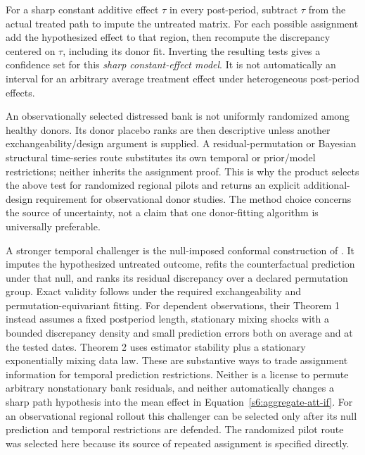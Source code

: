 For a sharp constant additive effect $\tau$ in every post-period, subtract
$\tau$ from the actual treated path to impute the untreated matrix. For
each possible assignment add the hypothesized effect to that region, then
recompute the discrepancy centered on $\tau$, including its donor fit.
Inverting the resulting tests gives a confidence set for this \emph{sharp
constant-effect model}. It is not automatically an interval for an arbitrary
average treatment effect under heterogeneous post-period effects.

An observationally selected distressed bank is not uniformly randomized
among healthy donors. Its donor placebo ranks are then descriptive unless
another exchangeability/design argument is supplied. A residual-permutation
or Bayesian structural time-series route substitutes its own temporal or
prior/model restrictions; neither inherits the assignment proof. This is
why the product selects the above test for randomized regional pilots and
returns an explicit additional-design requirement for observational donor
studies. The method choice concerns the source of uncertainty, not a claim
that one donor-fitting algorithm is universally preferable.


A stronger temporal challenger is the null-imposed conformal construction
of \citet{conformal2022}. It imputes the hypothesized untreated outcome,
refits the counterfactual prediction under that null, and ranks its residual
discrepancy over a declared permutation group. Exact validity follows under
the required exchangeability and permutation-equivariant fitting. For
dependent observations, their Theorem 1 instead assumes a fixed postperiod
length, stationary mixing shocks with a bounded discrepancy density and
small prediction errors both on average and at the tested dates. Theorem 2
uses estimator stability plus a stationary exponentially mixing data law.
These are substantive ways to trade assignment information for temporal
prediction restrictions. Neither is a license to permute arbitrary
nonstationary bank residuals, and neither automatically changes a sharp
path hypothesis into the mean effect in Equation~\eqref{s6:aggregate-att-if}.
For an observational regional rollout this challenger can be selected only
after its null prediction and temporal restrictions are defended. The
randomized pilot route was selected here because its source of repeated
assignment is specified directly.


